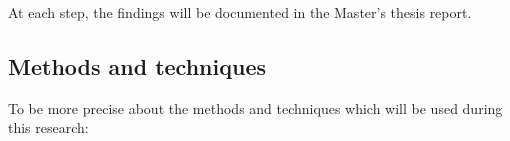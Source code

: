 \documentclass{article}
\begin{document}
At each step, the findings will be documented in the Master's thesis report.


\subsection{Methods and techniques}

To be more precise about the methods and techniques which will be used during this research:
\end{document}
